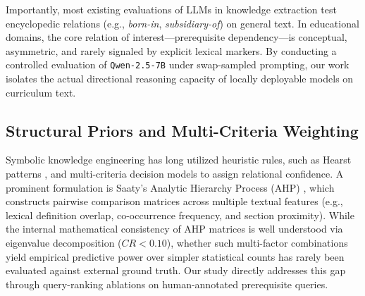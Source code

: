 Importantly, most existing evaluations of LLMs in knowledge extraction test encyclopedic relations (e.g., \textit{born-in}, \textit{subsidiary-of}) on general text. In educational domains, the core relation of interest—prerequisite dependency—is conceptual, asymmetric, and rarely signaled by explicit lexical markers. By conducting a controlled evaluation of \texttt{Qwen-2.5-7B} under swap-sampled prompting, our work isolates the actual directional reasoning capacity of locally deployable models on curriculum text.

\subsection{Structural Priors and Multi-Criteria Weighting}
Symbolic knowledge engineering has long utilized heuristic rules, such as Hearst patterns \cite{hearst1992hyponyms}, and multi-criteria decision models to assign relational confidence. A prominent formulation is Saaty's Analytic Hierarchy Process (AHP) \cite{saaty1980ahp}, which constructs pairwise comparison matrices across multiple textual features (e.g., lexical definition overlap, co-occurrence frequency, and section proximity). While the internal mathematical consistency of AHP matrices is well understood via eigenvalue decomposition ($CR < 0.10$), whether such multi-factor combinations yield empirical predictive power over simpler statistical counts has rarely been evaluated against external ground truth. Our study directly addresses this gap through query-ranking ablations on human-annotated prerequisite queries.
